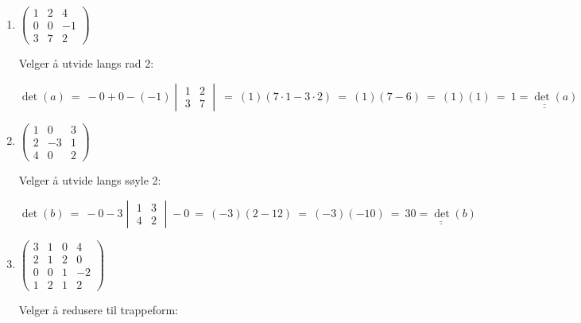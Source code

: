 \documentclass{article}
\newcommand{\uu}[1]{\underline{\underline{#1}}}
\begin{document}
\begin{enumerate}[a = ]

\item \( 
\begin{pmatrix}
1&2&4\\
0&0&-1\\
3&7&2
\end{pmatrix}\)
\vspace{1em}

Velger å utvide langs rad 2:

\(
\det(a) \ = \ -0+0-(-1)
\begin{vmatrix}
    1&2\\3&7
\end{vmatrix}
\ = \ (1)(7\cdot1 - 3\cdot2) 
\ = \ (1)(7-6) \ = \ (1)(1) \ = \ \uu{1 = \det(a)}
\)

\vspace{2em}

\item \(
\begin{pmatrix}
1&0&3\\
2&-3&1\\
4&0&2
\end{pmatrix}\)
\vspace{1em}

Velger å utvide langs søyle 2:

\(
\det(b) \ = \ -0 -3
\begin{vmatrix}
1&3\\4&2
\end{vmatrix}
- 0 \ = \ (-3)(2-12) \ = \ (-3)(-10) \ = \ \uu{30 = \det(b)}
\)

\vspace{2em}

\item \(
\begin{pmatrix}
3&1&0&4\\
2&1&2&0\\
0&0&1&-2\\
1&2&1&2
\end{pmatrix}\)
\vspace{1em}

Velger å redusere til trappeform:
\vspace{1em}


\end{enumerate}
\end{document}
